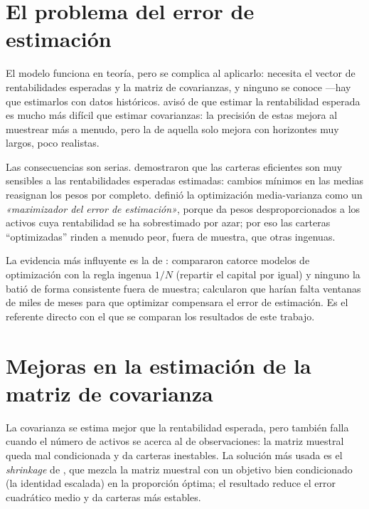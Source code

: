 \section{El problema del error de estimación}

El modelo funciona en teoría, pero se complica al aplicarlo: necesita el vector
de rentabilidades esperadas y la matriz de covarianzas, y ninguno se conoce
---hay que estimarlos con datos históricos. \citet{Merton1980} avisó de que
estimar la rentabilidad esperada es mucho más difícil que estimar covarianzas:
la precisión de estas mejora al muestrear más a menudo, pero la de aquella solo
mejora con horizontes muy largos, poco realistas.

Las consecuencias son serias. \citet{BestGrauer1991} demostraron que las
carteras eficientes son muy sensibles a las rentabilidades esperadas estimadas:
cambios mínimos en las medias reasignan los pesos por completo. \citet{Michaud1989}
definió la optimización media-varianza como un \textit{«maximizador del error de
estimación»}, porque da pesos desproporcionados a los activos cuya rentabilidad
se ha sobrestimado por azar; por eso las carteras ``optimizadas'' rinden a menudo
peor, fuera de muestra, que otras ingenuas.

La evidencia más influyente es la de \citet{DeMiguel2009}: compararon catorce
modelos de optimización con la regla ingenua $1/N$ (repartir el capital por
igual) y ninguno la batió de forma consistente fuera de muestra; calcularon que
harían falta ventanas de miles de meses para que optimizar compensara el error
de estimación. Es el referente directo con el que se comparan los resultados de
este trabajo.

\section{Mejoras en la estimación de la matriz de covarianza}

La covarianza se estima mejor que la rentabilidad esperada, pero también falla
cuando el número de activos se acerca al de observaciones: la matriz muestral
queda mal condicionada y da carteras inestables. La solución más usada es el
\textit{shrinkage} de \citet{Ledoit2004}, que mezcla la matriz muestral con un
objetivo bien condicionado (la identidad escalada) en la proporción óptima; el
resultado reduce el error cuadrático medio y da carteras más estables.


